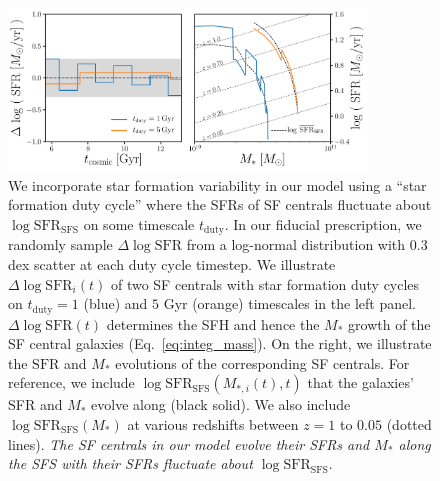 \documentclass[12pt, letterpaper, preprint, tighten]{aastex62}
\newcommand{\logsfr}{\log\mathrm{SFR}}
\newcommand{\logsfrsfs}{\log\mathrm{SFR}_\mathrm{SFS}}
\begin{document}
\begin{figure}
\begin{center}
\includegraphics[width=0.85\textwidth]{figs/sfh_pedagogical.pdf}
    \caption{We incorporate star formation variability in our model using a
    ``star formation duty cycle'' where the SFRs of SF centrals fluctuate about
    $\logsfrsfs$ on some timescale $t_\mathrm{duty}$. In our fiducial
    prescription, we randomly sample $\Delta \logsfr$ from a log-normal
    distribution with $0.3$ dex scatter at each duty cycle timestep. We illustrate
    $\Delta\logsfr_i(t)$ of two SF centrals with star formation duty cycles
    on $t_\mathrm{duty} = 1$ (blue) and $5$ Gyr (orange) timescales
    in the left panel. $\Delta \logsfr(t)$ determines the SFH and hence
    the $M_*$ growth of the SF central galaxies (Eq.~\ref{eq:integ_mass}).
    On the right, we illustrate the $\mathrm{SFR}$ and $M_*$ evolutions
    of the corresponding SF centrals. For reference, we include
    $\logsfrsfs(M_{*,i}(t), t)$ that the galaxies' SFR and $M_*$ evolve along
    (black solid). We also include $\logsfrsfs(M_*)$ at various redshifts
    between $z = 1$ to $0.05$ (dotted  lines). \emph{The SF centrals in 
    our model evolve their SFRs and $M_*$ along the SFS with their SFRs 
    fluctuate about $\logsfrsfs$}.} \label{fig:sfh_model}
\end{center}
\end{figure}
\end{document}

